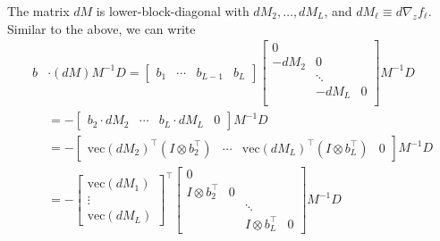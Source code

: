 \documentclass{article}
\begin{document}
The matrix $dM$ is lower-block-diagonal with $dM_2,\ldots, dM_L$, and $dM_\ell
    \equiv d \nabla_z f_\ell$. Similar to the above, we can write
\begin{align}
    b & \cdot (dM) M^{-1} D =
    \begin{bmatrix}
        b_1 & \cdots & b_{L-1} & b_L
    \end{bmatrix}
    \begin{bmatrix}
        0                  \\
        -dM_2 & 0          \\
              & \ddots     \\
              & -dM_L  & 0 \\
    \end{bmatrix}
    M^{-1} D \nonumber                                                           \\
      & = -\begin{bmatrix}
               b_2 \cdot dM_2 & \cdots & b_L \cdot dM_L & 0
           \end{bmatrix}
    M^{-1} D \nonumber                                                           \\
      & = -\begin{bmatrix}
               \mathrm{vec} \left(dM_2\right)^\top \left(I \otimes b_2^\top\right) &
               \cdots                                                              &
               \mathrm{vec} \left(dM_L\right)^\top \left(I \otimes b_L^\top\right) &
               0
           \end{bmatrix}
    M^{-1} D \nonumber                                                           \\
      & =
    -\begin{bmatrix}
         \mathrm{vec} \left(dM_1\right) \\
         \vdots                         \\
         \mathrm{vec} \left(dM_L\right)
     \end{bmatrix}
    ^\top
    \begin{bmatrix}
        0                                               \\
        I \otimes b_2^\top & 0                          \\
                           &   & \ddots                 \\
                           &   & I \otimes b_L^\top & 0
    \end{bmatrix}
    M^{-1} D \nonumber                                                           \\

\end{align}
\end{document}
